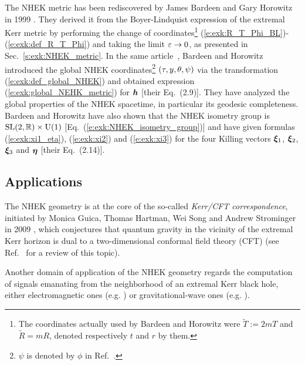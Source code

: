 \begin{hist}
The NHEK metric has been rediscovered by James Bardeen and Gary Horowitz in 1999 \cite{BardeH99}. They derived it from the Boyer-Lindquist expression of the extremal Kerr metric by performing the change of coordinates\footnote{The coordinates actually used by
Bardeen and Horowitz were $\tilde{T} := 2m T$ and $\tilde{R} = m R$, denoted
respectively $t$ and $r$ by them.}  (\ref{e:exk:R_T_Phi_BL})-(\ref{e:exk:def_R_T_Phi}) and taking the limit $\varepsilon\to 0$, as presented in
Sec.~\ref{s:exk:NHEK_metric}. In the same article~\cite{BardeH99},
Bardeen and Horowitz introduced
the global NHEK coordinates\footnote{$\psi$ is denoted by $\phi$ in Ref.~\cite{BardeH99}.}
$(\tau,y,\theta,\psi)$ via the transformation (\ref{e:exk:def_global_NHEK})
and obtained expression (\ref{e:exk:global_NEHK_metric}) for $\bm{h}$ [their Eq.~(2.9)]. They have
analyzed the global properties of the NHEK spacetime, in particular its geodesic completeness.
Bardeen and Horowitz have also shown that the NHEK isometry group is
$\mathrm{SL}(2,\mathbb{R})\times \mathrm{U}(1)$ [Eq.~(\ref{e:exk:NHEK_isometry_group})]
and have given formulas (\ref{e:exk:xi1_eta}), (\ref{e:exk:xi2}) and (\ref{e:exk:xi3})
for the four Killing vectors $\bm{\xi}_1$, $\bm{\xi}_2$, $\bm{\xi}_3$ and $\bm{\eta}$
[their Eq.~(2.14)].
\end{hist}

\subsection{Applications} \label{s:exk:applications}

The NHEK geometry is at the core of the so-called \emph{Kerr/CFT correspondence}, initiated by Monica Guica, Thomas Hartman, Wei Song and Andrew Strominger in 2009 \cite{GuicaHSS09}, which conjectures that quantum gravity
in the vicinity of the extremal Kerr horizon is dual to a two-dimensional
conformal field theory (CFT)
(see Ref.~\cite{Compe17} for a review of this topic).

Another domain of application of the NHEK geometry regards the computation
of signals emanating from the neighborhood
of an extremal Kerr black hole, either
electromagnetic ones (e.g. \cite{GrallLS18,CompeD20,KapecL20})
or gravitational-wave ones (e.g. \cite{CompeFHL18,GrallPW15}).

